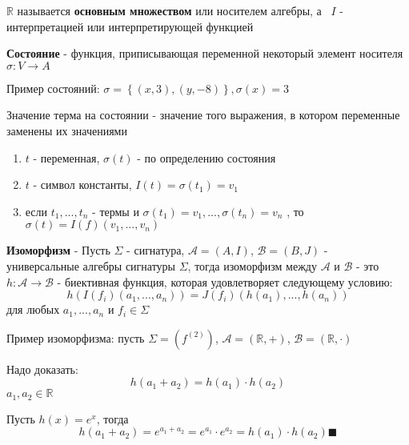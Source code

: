 \documentclass[../main/document.tex]{subfiles}
\begin{document}
\begin{dfn}
$\mathbb{R}$ называется \textbf{основным множеством} или носителем алгебры, а \
$I$ - интерпретацией или интерпретирующей функцией
\end{dfn}

\begin{dfn}
\textbf{Состояние} - функция, приписывающая переменной некоторый элемент носителя $\sigma :V\rightarrow A$
\end{dfn}

\begin{exm}
Пример состояний: $\sigma = \left\{(x,3),(y,-8)\right\}, \sigma(x)=3$
\end{exm}

\begin{dfn}
Значение терма на состоянии - значение того выражения, в котором переменные заменены их значениями

\begin{enumerate}
\item $t$ - переменная, $\sigma(t)$ - по определению состояния
\item $t$ - символ константы, $I(t)=\sigma(t_1)=v_1$
\item если $t_1,...,t_n$ - термы и $\sigma(t_1)=v_1,...,\sigma(t_n)=v_n$ , то $\sigma(t)=I(f)(v_1,...,v_n)$
\end{enumerate}
\end{dfn}
\begin{dfn}
\textbf{Изоморфизм} - Пусть $\Sigma$ - сигнатура, $\mathcal{A}=(A,I)$, $\mathcal{B}=(B,J)$ - \\
 универсальные алгебры сигнатуры $\Sigma$, тогда изоморфизм между $\mathcal{A}$ и $\mathcal{B}$ - это $h:\mathcal{A}\rightarrow \mathcal{B}$ - биективная функция, которая удовлетворяет следующему условию:
$$h(I(f_i)(a_1,...,a_n))=J(f_i)(h(a_1),...,h(a_n))$$
для любых $a_1,...,a_n$ и $f_i\in \Sigma$
\end{dfn}

\begin{exm}
Пример изоморфизма: пусть $\Sigma=(f^{(2)})$, $\mathcal{A}=(\mathbb{R},+)$, $\mathcal{B}=(\mathbb{R},\cdot)$

Надо доказать: 
$$h(a_1+a_2)=h(a_1)\cdot h(a_2)$$
$a_1,a_2\in \mathbb{R}$

Пусть $h(x)=e^x$, тогда
$$h(a_1+a_2)=e^{a_1+a_2}=e^{a_1}\cdot e^{a_2}=h(a_1)\cdot h(a_2)\blacksquare$$
\end{exm}
\end{document}
